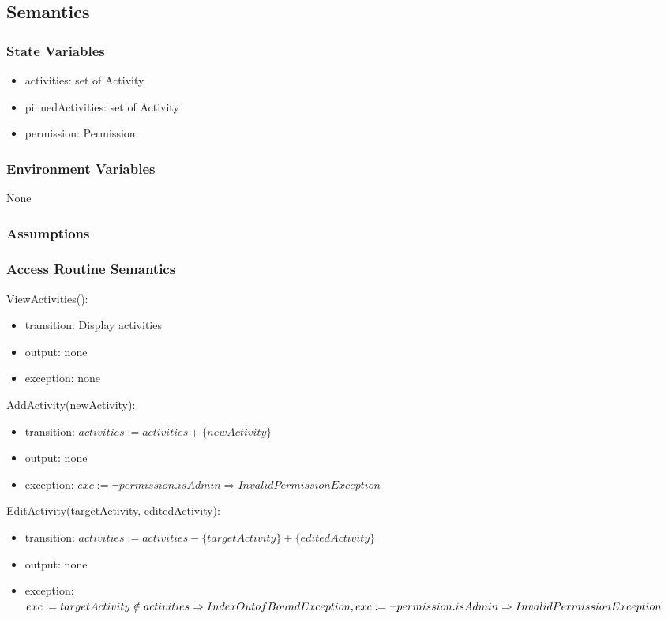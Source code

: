 \documentclass[12pt, titlepage]{article}
\begin{document}
\subsection{Semantics}

\subsubsection{State Variables}

\begin{itemize}
  \item activities: set of Activity
  \item pinnedActivities: set of Activity
  \item permission: Permission
\end{itemize}

\subsubsection{Environment Variables}

None

\subsubsection{Assumptions}

\subsubsection{Access Routine Semantics}

\noindent ViewActivities():
\begin{itemize}
\item transition: Display activities
\item output: none
\item exception: none
\end{itemize}

\noindent AddActivity(newActivity):
\begin{itemize}
\item transition: $activities := activities + \{newActivity\}$
\item output: none
\item exception: $exc := \neg permission.isAdmin \Rightarrow InvalidPermission Exception$
\end{itemize}

\noindent EditActivity(targetActivity, editedActivity):
\begin{itemize}
\item transition: $activities := activities - \{targetActivity\} + \{editedActivity\}$
\item output: none
\item exception: $exc := targetActivity \notin activities \Rightarrow IndexOutofBound Exception,\\ 
                  exc := \neg permission.isAdmin \Rightarrow InvalidPermission Exception$
\end{itemize}
\end{document}
